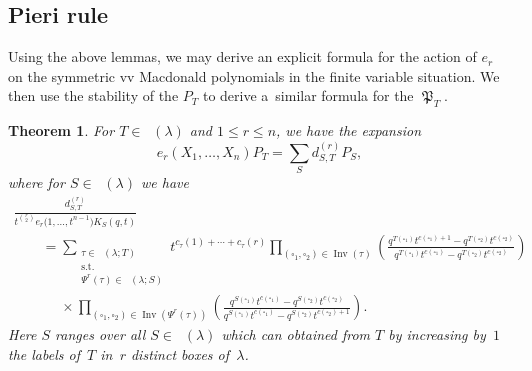 \documentclass[10pt,a4paper]{amsart}
\numberwithin{equation}{section}
\newtheorem{Theorem}{Theorem}[section]
\theoremstyle{definition}
\DeclareMathOperator{\PSYT}{\mathrm{PSYT}_{\geq 0}}
\DeclareMathOperator{\RSSYT}{\mathrm{RSSYT}_{\geq 0}}
\DeclareMathOperator{\MacD}{\mathfrak{P}}
\DeclareMathOperator{\Inv}{\mathrm{Inv}}
\begin{document}
\subsection{Pieri rule}

Using the above lemmas, we may derive an explicit formula for the action of $e_r$ on the symmetric vv Macdonald polynomials in the finite variable situation. We then use the stability of the $P_T$ to derive a~similar formula for the $\MacD_{T}$.


\begin{Theorem}\label{Pieri Rule for Finite vars}
 For $T \in \RSSYT(\lambda)$ and $1 \leq r \leq n$, we have the expansion
 \[
 e_r(X_1,\dots, X_n)P_T = \sum_{S} d^{(r)}_{S,T} P_{S},
 \]
 where for $S \in \RSSYT(\lambda)$ we have
 \begin{gather*}
 \frac{d^{(r)}_{S,T}}{t^{ {r\choose 2}}e_r\bigl(1,\dots, t^{n-1}\bigr)K_{S}(q,t)} \\
 \qquad = \sum_{\substack{\tau \in \PSYT(\lambda;T) \\ \text{s.t.}\\ \Psi^r(\tau) \in \PSYT(\lambda;S)}}
 t^{c_{\tau}(1)+\cdots + c_{\tau}(r)}
 \prod_{(\square_1,\square_2) \in \Inv(\tau)} \left( \frac{q^{T(\square_1)}t^{c(\square_1) +1} - q^{T(\square_2)}t^{c(\square_2)}}{q^{T(\square_1)}t^{c(\square_1)} - q^{T(\square_2)}t^{c(\square_2)}} \right) \\
 \phantom{ \qquad = }{} \times \prod_{(\square_1,\square_2) \in \Inv(\Psi^r(\tau))} \left( \frac{q^{S(\square_1)}t^{c(\square_1)} - q^{S(\square_2)}t^{c(\square_2)}}{q^{S(\square_1)}t^{c(\square_1)} - q^{S(\square_2)}t^{c(\square_2) +1}} \right).
 \end{gather*}
Here $S$ ranges over all $S \in \RSSYT(\lambda)$ which can obtained from $T$ by increasing by~$1$ the labels of~$T$ in~$r$ distinct boxes of~$\lambda$.
\end{Theorem}
\end{document}

